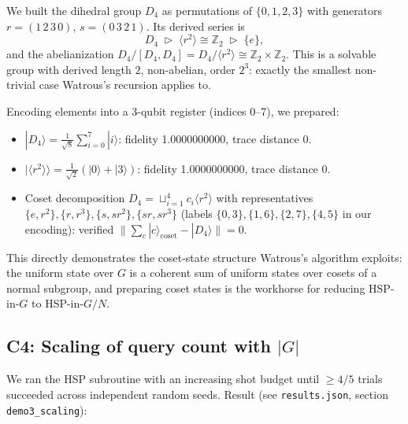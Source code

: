 \documentclass[11pt]{article}
\begin{document}
We built the dihedral group $D_4$ as permutations of $\{0,1,2,3\}$ with generators
$r = (1\,2\,3\,0)$, $s = (0\,3\,2\,1)$. Its derived series is
\[ D_4 \;\triangleright\; \langle r^2\rangle \cong \mathbb{Z}_2 \;\triangleright\; \{e\}, \]
and the abelianization $D_4 / [D_4,D_4] = D_4/\langle r^2\rangle \cong \mathbb{Z}_2\times\mathbb{Z}_2$.
This is a solvable group with derived length $2$, non-abelian, order $2^3$: exactly the
smallest non-trivial case Watrous's recursion applies to.

Encoding elements into a 3-qubit register (indices 0--7), we prepared:
\begin{itemize}\itemsep0pt
    \item $|D_4\rangle = \tfrac{1}{\sqrt{8}}\sum_{i=0}^{7} |i\rangle$: fidelity 1.0000000000, trace distance $0$.
    \item $|\langle r^2\rangle\rangle = \tfrac{1}{\sqrt{2}}(|0\rangle + |3\rangle)$: fidelity 1.0000000000, trace distance $0$.
    \item Coset decomposition $D_4 = \sqcup_{i=1}^{4} c_i \langle r^2\rangle$ with representatives
    $\{e,r^2\},\{r,r^3\},\{s,sr^2\},\{sr,sr^3\}$ (labels $\{0,3\},\{1,6\},\{2,7\},\{4,5\}$
    in our encoding): verified $\|\!\sum_{c} |c\rangle_{\text{coset}} - |D_4\rangle\| = 0$.
\end{itemize}

This directly demonstrates the coset-state structure Watrous's algorithm exploits: the
uniform state over $G$ is a coherent sum of uniform states over cosets of a normal subgroup,
and preparing coset states is the workhorse for reducing HSP-in-$G$ to HSP-in-$G/N$.

\subsection{C4: Scaling of query count with $|G|$}

We ran the HSP subroutine with an increasing shot budget until $\ge 4/5$ trials succeeded
across independent random seeds. Result (see \texttt{results.json}, section
\texttt{demo3\_scaling}):
\end{document}
